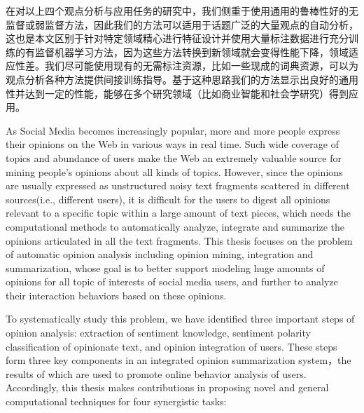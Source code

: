 \begin{cabstract}
在对以上四个观点分析与应用任务的研究中，我们侧重于使用通用的鲁棒性好的无监督或弱监督方法，因此我们的方法可以适用于话题广泛的大量观点的自动分析，这也是本文区别于针对特定领域精心进行特征设计并使用大量标注数据进行充分训练的有监督机器学习方法，因为这些方法转换到新领域就会变得性能下降，领域适应性差。我们尽可能使用现有的无需标注资源，比如一些现成的词典资源，可以为观点分析各种方法提供间接训练指导。基于这种思路我们的方法显示出良好的通用性并达到一定的性能，能够在多个研究领域（比如商业智能和社会学研究）得到应用。


\end{cabstract}

\begin{eabstract}

As Social Media becomes increasingly popular, more and more people express their opinions on the Web in various ways in real time. Such wide coverage of topics and abundance of users make the Web an extremely valuable source for mining people's opinions about all kinds of topics. However, since the opinions are usually expressed as unstructured noisy text fragments scattered in different sources(i.e., different users), it is difficult for the users to digest all opinions relevant to a specific topic within a large amount of text pieces, which needs the computational methods to automatically analyze, integrate and summarize the opinions articulated in all the text fragments. This thesis focuses on the problem of automatic opinion analysis including opinion mining, integration and summarization, whose goal is to better support modeling huge amounts of opinions for all topic of interests of social media users, and further to analyze their interaction behaviors based on these opinions. 

To systematically study this problem, we have identified three important steps of opinion analysis: extraction of sentiment knowledge, sentiment polarity classification of opinionate text, and opinion integration of users. These steps form three key components in an integrated opinion summarization system，the results of which are used to promote online behavior analysis of users. Accordingly, this thesis makes contributions in proposing novel and general computational techniques for four synergistic tasks: 


\end{eabstract}
